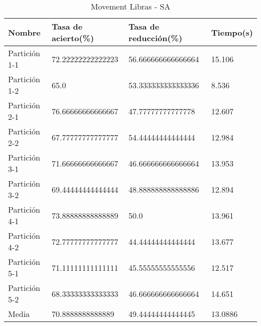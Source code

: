\begin{table}[H]
	\centering
	\begin{tabular}{l|lll}
		Nombre        & Tasa de acierto(\%) & Tasa de reducción(\%) & Tiempo(s) \\ \hline
		Partición 1-1 & 72.22222222222223   & 56.666666666666664    & 15.106    \\
		Partición 1-2 & 65.0                & 53.333333333333336    & 8.536     \\
		Partición 2-1 & 76.66666666666667   & 47.77777777777778     & 12.607    \\
		Partición 2-2 & 67.77777777777777   & 54.44444444444444     & 12.984    \\
		Partición 3-1 & 71.66666666666667   & 46.666666666666664    & 13.953    \\
		Partición 3-2 & 69.44444444444444   & 48.888888888888886    & 12.894    \\
		Partición 4-1 & 73.88888888888889   & 50.0                  & 13.961    \\
		Partición 4-2 & 72.77777777777777   & 44.44444444444444     & 13.677    \\
		Partición 5-1 & 71.11111111111111   & 45.55555555555556     & 12.517    \\
		Partición 5-2 & 68.33333333333333   & 46.666666666666664    & 14.651    \\ \hline
		Media         & 70.8888888888889    & 49.44444444444445     & 13.0886  
	\end{tabular}
	\caption{Movement Libras - SA}
	\label{MLIB-SA}
\end{table}